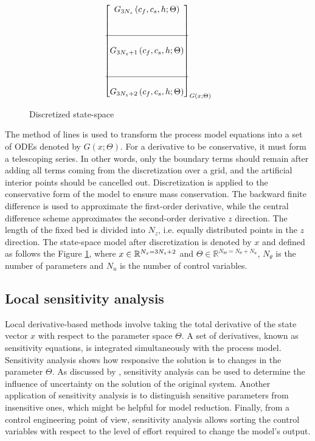 \documentclass[a4paper,fleqn]{cas-dc}
\begin{document}
\begin{figure}[!h]
{\begin{align*}
{\begin{bmatrix}
						G_{3N_z} \left( c_f,c_s,h; \Theta \right) \\ 
						\\ \\ \hline \\
						G_{3N_z+1} \left( c_f,c_s,h; \Theta \right) \\
						\\ \\ \hline \\
						G_{3N_z+2} \left( c_f,c_s,h; \Theta \right) 
				\end{bmatrix}}_{G \left( x; \Theta \right)} 
		\end{align*} }
	\caption{Discretized state-space}
	\label{fig:discretization}
	\end{figure}

	The method of lines is used to transform the process model equations into a set of ODEs denoted by $G(x;\Theta)$. For a derivative to be conservative, it must form a telescoping series. In other words, only the boundary terms should remain after adding all terms coming from the discretization over a grid, and the artificial interior points should be cancelled out. Discretization is applied to the conservative form of the model to ensure mass conservation. The backward finite difference is used to approximate the first-order derivative, while the central difference scheme approximates the second-order derivative $z$ direction. The length of the fixed bed is divided into $N_z$, i.e. equally distributed points in the $z$ direction. The state-space model after discretization is denoted by $x$ and defined as follows the Figure \ref{fig:discretization}, where ${\color{black}x} \in \mathbb{R}^{N_x = 3N_z+2} $ and $\Theta \in \mathbb{R}^{N_\Theta =  N_{\theta} + N_u } $, $N_{\theta}$ is the number of parameters and $N_{u}$ is the number of control variables.
	
	\subsection{Local sensitivity analysis} \label{CH: Sensitivity_Analysis}
	
	Local derivative-based methods involve taking the total derivative of the state vector $x$ with respect to the parameter space $\Theta$. A set of derivatives, known as sensitivity equations, is integrated simultaneously with the process model. Sensitivity analysis shows how responsive the solution is to changes in the parameter $\Theta$. As discussed by \citet{Dickinson1976}, sensitivity analysis can be used to determine the influence of uncertainty on the solution of the original system. Another application of sensitivity analysis is to distinguish sensitive parameters from insensitive ones, which might be helpful for model reduction. Finally, from a control engineering point of view, sensitivity analysis allows sorting the control variables with respect to the level of effort required to change the model's output.
	
\end{document}
